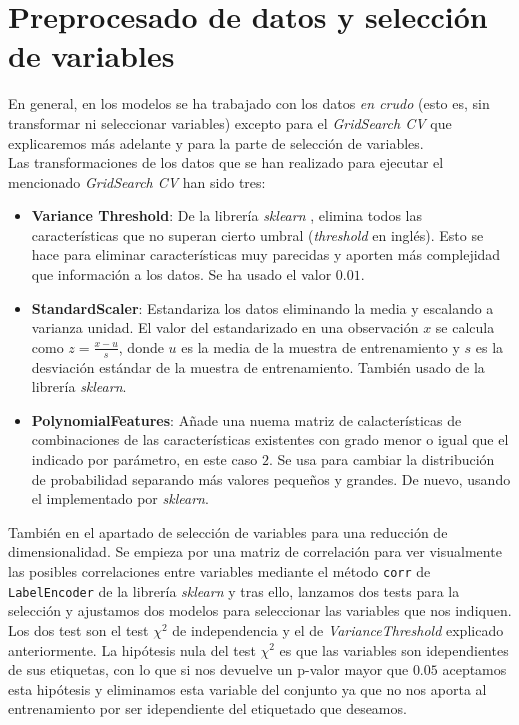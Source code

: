 \section{Preprocesado de datos y selección de variables}\label{preprocesado}
En general, en los modelos se ha trabajado con los datos \textit{en crudo} (esto es, sin transformar ni seleccionar variables) excepto para el \textit{GridSearch CV} que explicaremos más adelante y para la parte de selección de variables.\\
Las transformaciones de los datos que se han realizado para ejecutar el mencionado \textit{GridSearch CV} han sido tres:
\begin{itemize}
  \item \textbf{Variance Threshold}: De la librería \textit{sklearn} \cite{scikit-learn}, elimina todos las características que no superan cierto umbral (\textit{threshold} en inglés). Esto se hace para eliminar características muy parecidas y aporten más complejidad que información a los datos. Se ha usado el valor $0.01$.
  \item \textbf{StandardScaler}: Estandariza los datos eliminando la media y escalando a varianza unidad. El valor del estandarizado en una observación $x$ se calcula como $z=\frac{x-u}{s}$, donde $u$ es la media de la muestra de entrenamiento y $s$ es la desviación estándar de la muestra de entrenamiento. También usado de la librería \textit{sklearn}.
  \item \textbf{PolynomialFeatures}: Añade una nuema matriz de calacterísticas de combinaciones de las características existentes con grado menor o igual que el indicado por parámetro, en este caso $2$. Se usa para cambiar la distribución de probabilidad separando más valores pequeños y grandes. De nuevo, usando el implementado por \textit{sklearn}.
\end{itemize}
También en el apartado de selección de variables para una reducción de dimensionalidad. Se empieza por una matriz de correlación para ver visualmente las posibles correlaciones entre variables mediante el método \texttt{corr} de \texttt{LabelEncoder} de la librería \textit{sklearn} y tras ello, lanzamos dos tests para la selección y ajustamos dos modelos para seleccionar las variables que nos indiquen.\\
Los dos test son el test $\chi^2$ de independencia y el de \textit{VarianceThreshold} explicado anteriormente. La hipótesis nula del test $\chi^2$ es que las variables son idependientes de sus etiquetas, con lo que si nos devuelve un p-valor mayor que $0.05$ aceptamos esta hipótesis y eliminamos esta variable del conjunto ya que no nos aporta al entrenamiento por ser idependiente del etiquetado que deseamos.\\
